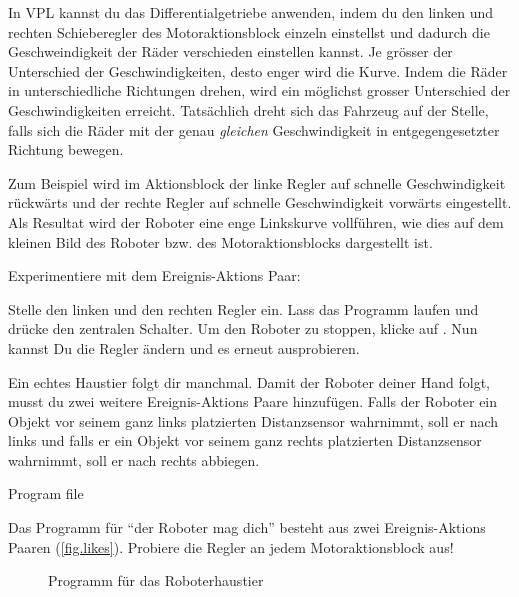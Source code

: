 In VPL kannst du das Differentialgetriebe anwenden, indem du den linken und rechten Schieberegler des Motoraktionsblock einzeln einstellst und dadurch die Geschweindigkeit der Räder verschieden einstellen kannst.
Je grösser der Unterschied der Geschwindigkeiten,
desto enger wird die Kurve. Indem die Räder in unterschiedliche Richtungen drehen,
wird ein möglichst grosser Unterschied der Geschwindigkeiten erreicht. 
Tatsächlich dreht sich das Fahrzeug auf der Stelle, 
falls sich die Räder mit der genau \emph{gleichen} 
Geschwindigkeit in entgegengesetzter Richtung bewegen.

Zum Beispiel wird im Aktionsblock  der linke Regler auf schnelle Geschwindigkeit rückwärts 
und der rechte Regler auf schnelle Geschwindigkeit vorwärts eingestellt. 
Als Resultat wird der Roboter eine enge Linkskurve vollführen, 
wie dies auf dem kleinen Bild des Roboter bzw. des Motoraktionsblocks dargestellt ist.

Experimentiere mit dem Ereignis-Aktions Paar: 

Stelle den linken und den rechten Regler ein.
Lass das Programm laufen und drücke den zentralen Schalter.
Um den Roboter zu stoppen, klicke auf .
Nun kannst Du die Regler ändern und es erneut ausprobieren.



Ein echtes Haustier folgt dir manchmal.
Damit der Roboter deiner Hand folgt,
musst du zwei weitere Ereignis-Aktions Paare hinzufügen.
Falls der Roboter ein Objekt vor seinem
ganz links platzierten Distanzsensor wahrnimmt,
soll er nach links und falls er ein Objekt
vor seinem ganz rechts platzierten Distanzsensor wahrnimmt, soll er nach rechts abbiegen.

{\raggedleft \hfill Program file }

Das Programm für ``der Roboter mag dich'' besteht aus zwei Ereignis-Aktions Paaren
(\cref{fig.likes}).
Probiere die Regler an jedem Motoraktionsblock aus!

\begin{figure}
	\hfill
	\caption{Programm für das Roboterhaustier}
\end{figure}

